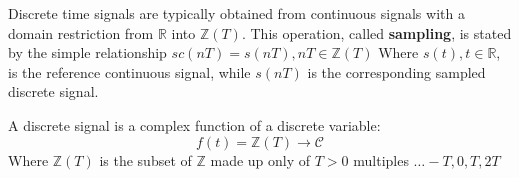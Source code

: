 Discrete time signals are typically obtained from continuous signals with a domain restriction from $\mathbb{R}$ into $\mathbb{Z}(T)$.
This operation, called \textbf{sampling}, is stated by the simple relationship
\(
   sc(nT) = s(nT) , nT \in \mathbb{Z}(T)
\)
Where $s(t) , t \in \mathbb{R}$, is the reference continuous signal, while $s(nT)$ is the corresponding sampled discrete signal.

\begin{definition}
   A discrete signal is a complex function of a discrete variable:
   \[
      f(t)= \mathbb{Z}(T) \rightarrow \mathcal{C}
   \]
   Where $\mathbb{Z}(T)$ is the subset of $\mathbb{Z}$ made up only of $T>0$ multiples ${\dots -T,0,T,2T}$
\end{definition}

